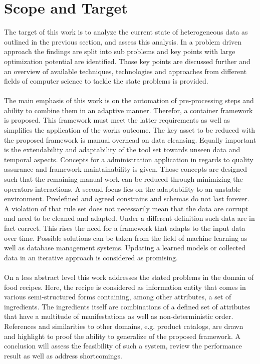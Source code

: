 \section{Scope and Target\label{sec:scope}}
The target of this work is to analyze the current state of heterogeneous data as outlined in the previous section, and assess this analysis. In a problem driven approach the findings are split into sub problems and key points with large optimization potential are identified. Those key points are discussed further and an overview of available techniques, technologies and approaches from different fields of computer science to tackle the state problems is provided.
\\\\
The main emphasis of this work is on the automation of pre-processing steps and ability to combine them in an adaptive manner. Therefor, a container framework is proposed. This framework must meet the latter requirements as well as simplifies the application of the works outcome. The key asset to be reduced with the proposed framework is manual overhead on data cleansing. Equally important is the extendability and adaptability of the tool set towards unseen data and temporal aspects. Concepts for a administration application in regards to quality assurance and framework maintainability is given. Those concepts are designed such that the remaining manual work can be reduced through minimizing the operators interactions. 
A second focus lies on the adaptability to an unstable environment. Predefined and agreed constrains and schemas do not last forever. A violation of that rule set does not necessarily mean that the data are corrupt and need to be cleaned and adapted. Under a different definition such data are in fact correct. This rises the need for a framework that adapts to the input data over time. Possible solutions can be taken from the field of machine learning as well as database management systems. Updating a learned models or collected data in an iterative approach is considered as promising. 
\\\\
On a less abstract level this work addresses the stated problems in the domain of food recipes. Here, the recipe is considered as information entity that comes in various semi-structured forms containing, among other attributes, a set of ingredients. The ingredients itself are combinations of a defined set of attributes that have a multitude of manifestations as well as non-deterministic order. References and similarities to other domains, e.g. product catalogs, are drawn and highlight to proof the ability to generalize of the proposed framework. A conclusion will assess the feasibility of such a system, review the performance result as well as address shortcomings.
